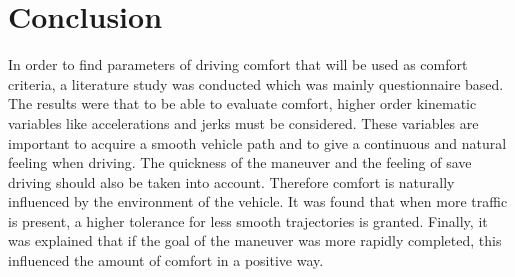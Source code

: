 %
%
%
%


\section{Conclusion}
In order to find parameters of driving comfort that will be used as comfort criteria, a literature study was conducted which was mainly questionnaire based. The results were that to be able to evaluate comfort, higher order kinematic variables like accelerations and jerks must be considered. These variables are important to acquire a smooth vehicle path and to give a continuous and natural feeling when driving. The quickness of the maneuver and the feeling of save driving should also be taken into account. Therefore comfort is naturally influenced by the environment of the vehicle. It was found that when more traffic is present, a higher tolerance for less smooth trajectories is granted. Finally, it was explained that if the goal of the maneuver was more rapidly completed, this influenced the amount of comfort in a positive way.\\

